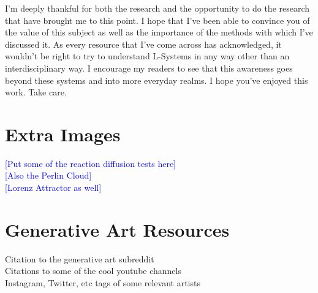 \documentclass[12pt,twoside]{reedthesis}
\begin{document}
	I'm deeply thankful for both the research and the opportunity to do the research that have brought me to this point. I hope that I've been able to convince you of the value of this subject as well as the importance of the methods with which I've discussed it. As every resource that I've come across has acknowledged, it wouldn't be right to try to understand L-Systems in any way other than an interdisciplinary way. I encourage my readers to see that this awareness goes beyond these systems and into more everyday realms. I hope you've enjoyed this work. Take care.

    \appendix
      \chapter{Extra Images}
      \textcolor{blue}{[Put some of the reaction diffusion tests here]}\\
      \textcolor{blue}{[Also the Perlin Cloud]}\\
      \textcolor{blue}{[Lorenz Attractor as well]}\\
      \chapter{Generative Art Resources}
      \label{Resources}
      Citation to the generative art subreddit\\
      Citations to some of the cool youtube channels\\
      Instagram, Twitter, etc tags of some relevant artists\\

\backmatter 


\nocite{*}
 
\end{document}
